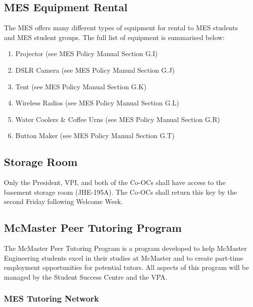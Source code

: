 \subsection{MES Equipment Rental}
\label{mes-equipment-rental}
The MES offers many different types of equipment for rental to MES
students and MES student groups. The full list of equipment is
summarised below: %

\begin{enumerate}
 \item
  Projector (see MES Policy Manual Section G.I)
 \item
  DSLR Camera (see MES Policy Manual Section G.J)
 \item
  Tent (see MES Policy Manual Section G.K)
 \item
  Wireless Radios (see MES Policy Manual Section G.L)
 \item
  Water Coolers \& Coffee Urns (see MES Policy Manual Section G.R)
 \item
  Button Maker (see MES Policy Manual Section G.T)
\end{enumerate}

\subsection{Storage Room}
\label{storage-room}

Only the President, VPI, and both of the Co-OCs shall have access to the basement storage room (JHE-195A). The Co-OCs shall return this key by the second Friday following Welcome Week.

\subsection{McMaster Peer Tutoring Program}
\label{mcmaster-peer-tutoring-program}

The McMaster Peer Tutoring Program is a program developed to help McMaster Engineering students excel in their studies at McMaster and to create part-time employment opportunities for potential tutors. All aspects of this program will be managed by the Student Success Centre and the VPA.

\subsubsection{MES Tutoring Network}
\label{mes-tutoring-network}

